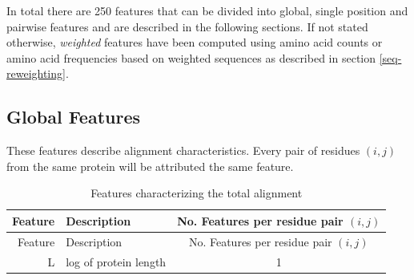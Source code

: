 \documentclass[11pt,a4paper,twoside]{book}
\theoremstyle{definition}
\theoremstyle{definition}
\theoremstyle{remark}
\begin{document}
In total there are 250 features that can be divided into global, single
position and pairwise features and are described in the following
sections. If not stated otherwise, \emph{weighted} features have been
computed using amino acid counts or amino acid frequencies based on
weighted sequences as described in section \ref{seq-reweighting}.

\subsection{Global Features}\label{seq-features-global}

These features describe alignment characteristics. Every pair of
residues \((i,j)\) from the same protein will be attributed the same
feature.

\begin{longtable}[]{@{}rlc@{}}
\caption{\label{tab:global-features} Features characterizing the total
alignment}\tabularnewline
\toprule
\begin{minipage}[b]{0.23\columnwidth}\raggedleft\strut
Feature\strut
\end{minipage} & \begin{minipage}[b]{0.50\columnwidth}\raggedright\strut
Description\strut
\end{minipage} & \begin{minipage}[b]{0.18\columnwidth}\centering\strut
No. Features per residue pair \((i, j)\)\strut
\end{minipage}\tabularnewline
\midrule
\endfirsthead
\toprule
\begin{minipage}[b]{0.23\columnwidth}\raggedleft\strut
Feature\strut
\end{minipage} & \begin{minipage}[b]{0.50\columnwidth}\raggedright\strut
Description\strut
\end{minipage} & \begin{minipage}[b]{0.18\columnwidth}\centering\strut
No. Features per residue pair \((i, j)\)\strut
\end{minipage}\tabularnewline
\midrule
\endhead
\begin{minipage}[t]{0.23\columnwidth}\raggedleft\strut
L\strut
\end{minipage} & \begin{minipage}[t]{0.50\columnwidth}\raggedright\strut
log of protein length\strut
\end{minipage} & \begin{minipage}[t]{0.18\columnwidth}\centering\strut
1\strut
\end{minipage}\tabularnewline

\end{longtable}
\end{document}
